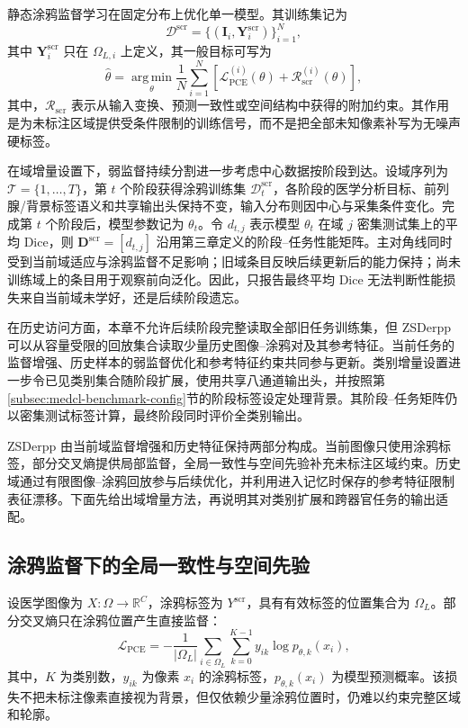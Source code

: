 静态涂鸦监督学习在固定分布上优化单一模型。其训练集记为
\[
\mathcal{D}^{\mathrm{scr}}
=
\bigl\{(\mathbf{I}_i,\mathbf{Y}^{\mathrm{scr}}_i)\bigr\}_{i=1}^{N},
\]
其中 $\mathbf{Y}^{\mathrm{scr}}_i$ 只在 $\Omega_{L,i}$ 上定义，其一般目标可写为
\begin{equation}
\widehat{\theta}
=
\operatorname*{arg\,min}_{\theta}
\frac{1}{N}\sum_{i=1}^{N}
\left[
\mathcal{L}_{\mathrm{PCE}}^{(i)}(\theta)
+
\mathcal{R}_{\mathrm{scr}}^{(i)}(\theta)
\right],
\label{eq:scribble-static-objective}
\end{equation}
其中，$\mathcal{R}_{\mathrm{scr}}$ 表示从输入变换、预测一致性或空间结构中获得的附加约束。其作用是为未标注区域提供受条件限制的训练信号，而不是把全部未知像素补写为无噪声硬标签。

在域增量设置下，弱监督持续分割进一步考虑中心数据按阶段到达。设域序列为
$\mathcal{T}=\{1,\ldots,T\}$，第 $t$ 个阶段获得涂鸦训练集
$\mathcal{D}^{\mathrm{scr}}_t$，各阶段的医学分析目标、前列腺/背景标签语义和共享输出头保持不变，输入分布则因中心与采集条件变化。完成第 $t$ 个阶段后，模型参数记为 $\theta_t$。令
$d_{t,j}$ 表示模型 $\theta_t$ 在域 $j$ 密集测试集上的平均 Dice，则
$\mathbf{D}^{\mathrm{scr}}=[d_{t,j}]$ 沿用第三章定义的阶段--任务性能矩阵。主对角线同时受到当前域适应与涂鸦监督不足影响；旧域条目反映后续更新后的能力保持；尚未训练域上的条目用于观察前向泛化。因此，只报告最终平均 Dice 无法判断性能损失来自当前域未学好，还是后续阶段遗忘。

在历史访问方面，本章不允许后续阶段完整读取全部旧任务训练集，但 ZSDerpp 可以从容量受限的回放集合读取少量历史图像--涂鸦对及其参考特征。当前任务的监督增强、历史样本的弱监督优化和参考特征约束共同参与更新。类别增量设置进一步令已见类别集合随阶段扩展，使用共享八通道输出头，并按照第\ref{subsec:medcl-benchmark-config}节的阶段标签设定处理背景。其阶段--任务矩阵仍以密集测试标签计算，最终阶段同时评价全类别输出。


ZSDerpp 由当前域监督增强和历史特征保持两部分构成。当前图像只使用涂鸦标签，部分交叉熵提供局部监督，全局一致性与空间先验补充未标注区域约束\cite{zhang2026zscribbleseg}。历史域通过有限图像--涂鸦回放参与后续优化，并利用进入记忆时保存的参考特征限制表征漂移。下面先给出域增量方法，再说明其对类别扩展和跨器官任务的输出适配\cite{cermelli2020mib}。

\subsection{涂鸦监督下的全局一致性与空间先验}
\label{subsec:prior-scribble-foundation}

设医学图像为 $X:\Omega\rightarrow\mathbb{R}^{C}$，涂鸦标签为 $Y^{\mathrm{scr}}$，具有有效标签的位置集合为 $\Omega_L$。部分交叉熵只在涂鸦位置产生直接监督：
\begin{equation}
\mathcal{L}_{\mathrm{PCE}}
=
-\frac{1}{|\Omega_L|}
\sum_{i\in\Omega_L}
\sum_{k=0}^{K-1}
y_{ik}\log p_{\theta,k}(x_i),
\label{eq:scribblecl-pce}
\end{equation}
其中，$K$ 为类别数，$y_{ik}$ 为像素 $x_i$ 的涂鸦标签，$p_{\theta,k}(x_i)$ 为模型预测概率。该损失不把未标注像素直接视为背景，但仅依赖少量涂鸦位置时，仍难以约束完整区域和轮廓。

